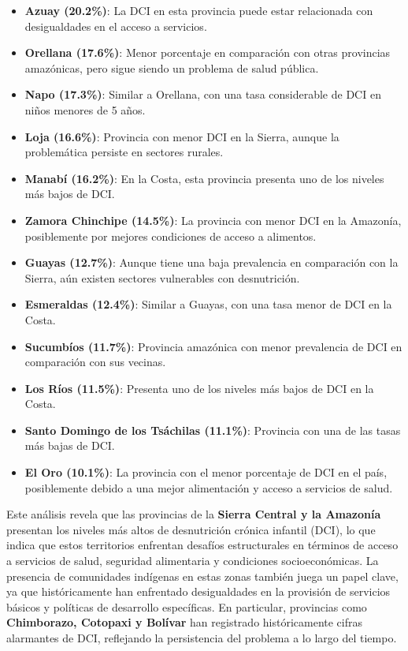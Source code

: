 \documentclass[
  letterpaper,
  DIV=11,
  numbers=noendperiod]{scrreprt}
\begin{document}
\begin{itemize}
\item
  \textbf{Azuay (20.2\%)}: La DCI en esta provincia puede estar
  relacionada con desigualdades en el acceso a servicios.\\
\item
  \textbf{Orellana (17.6\%)}: Menor porcentaje en comparación con otras
  provincias amazónicas, pero sigue siendo un problema de salud
  pública.\\
\item
  \textbf{Napo (17.3\%)}: Similar a Orellana, con una tasa considerable
  de DCI en niños menores de 5 años.\\
\item
  \textbf{Loja (16.6\%)}: Provincia con menor DCI en la Sierra, aunque
  la problemática persiste en sectores rurales.\\
\item
  \textbf{Manabí (16.2\%)}: En la Costa, esta provincia presenta uno de
  los niveles más bajos de DCI.\\
\item
  \textbf{Zamora Chinchipe (14.5\%)}: La provincia con menor DCI en la
  Amazonía, posiblemente por mejores condiciones de acceso a
  alimentos.\\
\item
  \textbf{Guayas (12.7\%)}: Aunque tiene una baja prevalencia en
  comparación con la Sierra, aún existen sectores vulnerables con
  desnutrición.\\
\item
  \textbf{Esmeraldas (12.4\%)}: Similar a Guayas, con una tasa menor de
  DCI en la Costa.\\
\item
  \textbf{Sucumbíos (11.7\%)}: Provincia amazónica con menor prevalencia
  de DCI en comparación con sus vecinas.\\
\item
  \textbf{Los Ríos (11.5\%)}: Presenta uno de los niveles más bajos de
  DCI en la Costa.\\
\item
  \textbf{Santo Domingo de los Tsáchilas (11.1\%)}: Provincia con una de
  las tasas más bajas de DCI.\\
\item
  \textbf{El Oro (10.1\%)}: La provincia con el menor porcentaje de DCI
  en el país, posiblemente debido a una mejor alimentación y acceso a
  servicios de salud.
\end{itemize}

Este análisis revela que las provincias de la \textbf{Sierra Central y
la Amazonía} presentan los niveles más altos de desnutrición crónica
infantil (DCI), lo que indica que estos territorios enfrentan desafíos
estructurales en términos de acceso a servicios de salud, seguridad
alimentaria y condiciones socioeconómicas. La presencia de comunidades
indígenas en estas zonas también juega un papel clave, ya que
históricamente han enfrentado desigualdades en la provisión de servicios
básicos y políticas de desarrollo específicas. En particular, provincias
como \textbf{Chimborazo, Cotopaxi y Bolívar} han registrado
históricamente cifras alarmantes de DCI, reflejando la persistencia del
problema a lo largo del tiempo.
\end{document}
